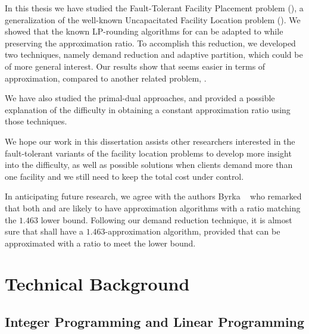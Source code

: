 \documentclass[oneside,final]{ucr}
\begin{document}
In this thesis we have studied the Fault-Tolerant Facility
Placement problem ({\FTFP}), a generalization of the
well-known Uncapacitated Facility Location problem
({\UFL}). We showed that the known LP-rounding algorithms
for {\UFL} can be adapted to {\FTFP} while preserving the
approximation ratio. To accomplish this reduction, we
developed two techniques, namely demand reduction and
adaptive partition, which could be of more general
interest. Our results show that {\FTFP} seems easier in
terms of approximation, compared to another related problem,
{\FTFL}.

We have also studied the primal-dual approaches, and
provided a possible explanation of the difficulty in
obtaining a constant approximation ratio using those
techniques.

We hope our work in this dissertation assists other
researchers interested in the fault-tolerant variants of the
facility location problems to develop more insight into the
difficulty, as well as possible solutions when clients
demand more than one facility and we still need to keep the
total cost under control.

In anticipating future research, we agree with the authors
Byrka {\etal}~\cite{ByrkaSS10} who remarked that both
{\UFL} and {\FTFL} are likely to have approximation
algorithms with a ratio matching the $1.463$ lower
bound. Following our demand reduction technique, it is
almost sure that {\FTFP} shall have a $1.463$-approximation
algorithm, provided that {\FTFL} can be approximated with a
ratio to meet the lower bound.




\appendix
\chapter{Technical Background}

\section{Integer Programming and Linear Programming}
\label{sec: ILP}
\end{document}
